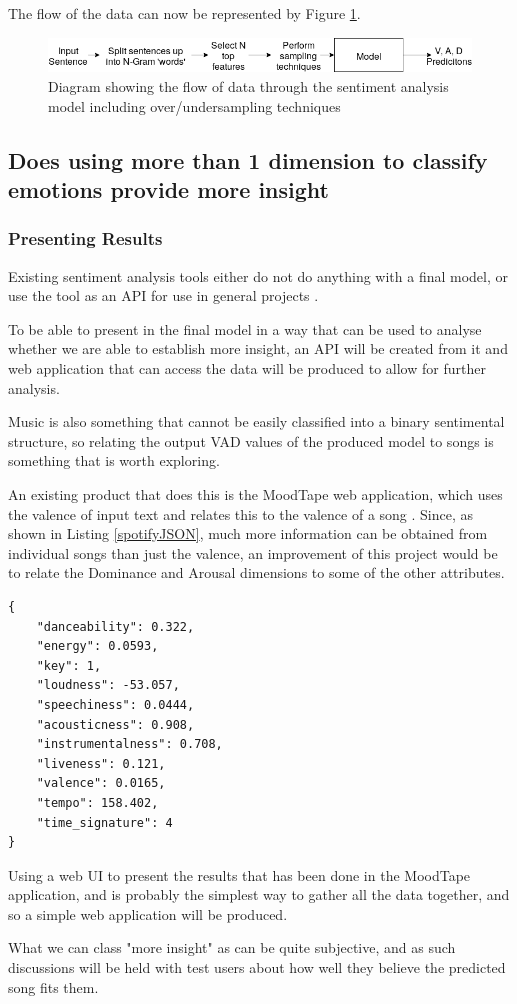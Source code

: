 The flow of the data can now be represented by Figure \ref{model:finalFlow}.

\begin{figure}[h]
\centering
\includegraphics[scale=0.5]{litImgs/finalmodelflow.png}
\caption{Diagram showing the flow of data through the sentiment analysis model including over/undersampling techniques}
\label{model:finalFlow}
\end{figure}


\subsection{Does using more than 1 dimension to classify emotions provide more insight}

\subsubsection{Presenting Results}

Existing sentiment analysis tools either do not do anything with a final model, or use the tool as an API for use in general projects \cite{sentimentAPI}.  

To be able to present in the final model in a way that can be used to analyse whether we are able to establish more insight, an API will be created from it and web application that can access the data will be produced to allow for further analysis.

Music is also something  that cannot be easily classified into a binary sentimental structure, so relating the output VAD values of the produced model to songs is something that is worth exploring.

An existing product that does this is the MoodTape web application, which uses the valence of input text and relates this to the valence of a song  \cite{moodtape}. Since, as shown in Listing \ref{spotifyJSON}, much more information can be obtained from individual songs than just the valence, an improvement of this project would be to relate the Dominance and Arousal dimensions to some of the other attributes.

\begin{lstlisting}[style=leftCode, caption={Some of the attributes of a song obtained through requesting information through the Spotify API},captionpos=b, label={spotifyJSON}]
{
    "danceability": 0.322,
    "energy": 0.0593,
    "key": 1,
    "loudness": -53.057,
    "speechiness": 0.0444,
    "acousticness": 0.908,
    "instrumentalness": 0.708,
    "liveness": 0.121,
    "valence": 0.0165,
    "tempo": 158.402,
    "time_signature": 4
}
\end{lstlisting}

Using a web UI to present the results that has been done in the MoodTape application, and is probably the simplest way to gather all the data together, and so a simple web application will be produced. 

What we can class "more insight" as can be quite subjective, and as such discussions will be held with test users about how well they believe the predicted song fits them.